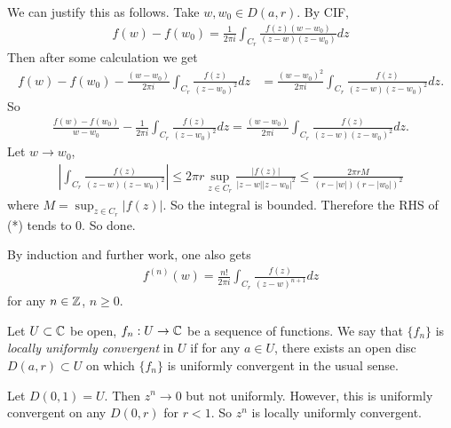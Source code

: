 \documentclass[a4paper]{article}
\begin{document}
We can justify this as follows. Take $w,w_0 \in D(a,r)$. By CIF,
\begin{equation*}
\begin{aligned}
f(w) - f(w_0) = \frac{1}{2\pi i} \int_{C_r} \frac{f(z)(w-w_0)}{(z-w)(z-w_0)} dz
\end{aligned}
\end{equation*}
Then after some calculation we get
\begin{equation*}\tag{*}
\begin{aligned}
f(w)-f(w_0) - \frac{(w-w_0)}{2\pi i} \int_{C_r} \frac{f(z)}{(z-w_0)^2} dz &= \frac{(w-w_0)^2}{2\pi i} \int_{C_r} \frac{f(z)}{(z-w) (z-w_0)^2} dz.
\end{aligned}
\end{equation*}
So
\begin{equation*}
\begin{aligned}
\frac{f(w)-f(w_0)}{w-w_0} - \frac{1}{2\pi i} \int_{C_r} \frac{f(z)}{(z-w_0)^2} dz = \frac{(w-w_0)}{2\pi i} \int_{C_r} \frac{f(z)}{(z-w)(z-w_0)^2} dz.
\end{aligned}
\end{equation*}
Let $w \to w_0$,
\begin{equation*}
\begin{aligned}
\left| \int_{C_r} \frac{f(z)}{(z-w)(z-w_0)^2} \right| \leq 2\pi r \sup_{z \in C_r} \frac{|f(z)|}{|z-w||z-w_0|^2} \leq \frac{2\pi rM}{(r-|w|)(r-|w_0|)^2}
\end{aligned}
\end{equation*}
where $M= \sup_{z \in C_r} |f(z)|$. So the integral is bounded. Therefore the RHS of (*) tends to $0$. So done.

By induction and further work, one also gets
\begin{equation*}
\begin{aligned}
f^{(n)} (w) = \frac{n!}{2\pi i} \int_{C_r} \frac{f(z)}{(z-w)^{n+1}} dz
\end{aligned}
\end{equation*}
for any $n \in \mathbb{Z}$, $n \geq 0$.

\begin{defi}
Let $U \subset \mathbb{C}$ be open, $f_n:U \to \mathbb{C}$ be a sequence of functions. We say that $\{f_n\}$ is \emph{locally uniformly convergent} in $U$ if for any $a \in U$, there exists an open disc $D(a,r) \subset U$ on which $\{f_n\}$ is uniformly convergent in the usual sense.
\end{defi}

\begin{eg}
Let $D(0,1) = U$. Then $z^n \to 0$ but not uniformly. However, this is uniformly convergent on any $D(0,r)$ for $r<1$. So $z^n$ is locally uniformly convergent.
\end{eg}
\end{document}
